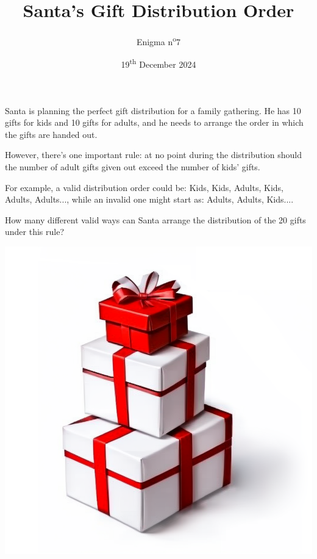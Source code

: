 \documentclass[a4paper, top=10mm]{article}
\title{\textbf{\huge{Santa's Gift Distribution Order}}}
\author{Enigma n\textsuperscript{o}7}
\date{19\textsuperscript{th} December 2024}
\begin{document}
	\maketitle
	
	Santa is planning the perfect gift distribution for a family gathering. He has 10 gifts for kids and 10 gifts for adults, and he needs to arrange the order in which the gifts are handed out.
	
	However, there’s one important rule: at no point during the distribution should the number of adult gifts given out exceed the number of kids’ gifts.
	
	For example, a valid distribution order could be: Kids, Kids, Adults, Kids, Adults, Adults..., while an invalid one might start as: Adults, Adults, Kids....
	
	How many different valid ways can Santa arrange the distribution of the 20 gifts under this rule?
	
	\begin{center}
		\includegraphics[width=0.8\linewidth]{07presents.png}
	\end{center}
	
	
\end{document}
